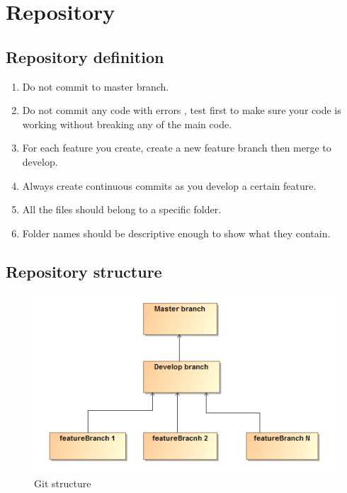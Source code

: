 \documentclass{article}
\begin{document}
                \section{Repository}
                    \subsection{Repository definition}
                        \begin{enumerate}
                            \item Do not commit to master branch.
                            \item Do not commit any code with errors , test first to make sure your code is working without breaking any of the main code.
                            \item For each feature you create, create a new feature branch then merge to develop.
                            \item Always create continuous commits as you develop a certain feature.
                            \item All the files should belong to a specific folder.
                            \item Folder names should be descriptive enough to show what they contain.
                        \end{enumerate}
                    \subsection{Repository structure}
                    
\begin{figure}[h]
    \centering
    \includegraphics[scale=0.9]{git.PNG}
    \caption{Git structure}
    \label{fig:domain}
\end{figure}
\end{document}
